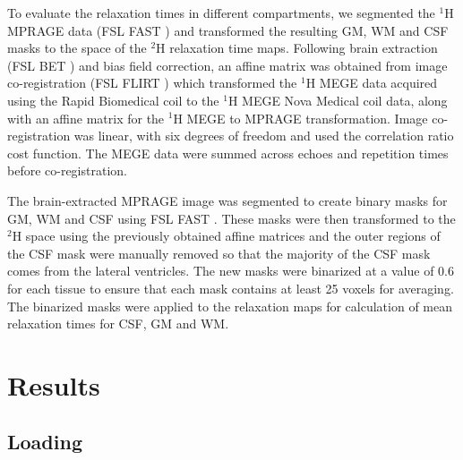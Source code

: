 To evaluate the relaxation times in different compartments, we segmented the $^1$H \ac{MPRAGE} data (FSL FAST \cite{Zhang2001SegmentationAlgorithm}) and transformed the resulting \ac{GM}, \ac{WM} and \ac{CSF} masks to the space of the $^2$H relaxation time maps. Following brain extraction (FSL BET \cite{Smith2002FastExtraction}) and bias field correction, an affine matrix was obtained from image co-registration (FSL FLIRT \cite{Jenkinson2001AImages,Jenkinson2002ImprovedImages}) which transformed the $^1$H \ac{MEGE} data acquired using the Rapid Biomedical coil to the $^1$H \ac{MEGE} Nova Medical coil data, along with an affine matrix for the $^1$H \ac{MEGE} to \ac{MPRAGE} transformation. Image co-registration was linear, with six degrees of freedom and used the correlation ratio cost function. The \ac{MEGE} data were summed across echoes and repetition times before co-registration.

The brain-extracted \ac{MPRAGE} image was segmented to create binary masks for \ac{GM}, \ac{WM} and \ac{CSF} using FSL FAST \cite{Zhang2001SegmentationAlgorithm}. These masks were then transformed to the $^2$H space using the previously obtained affine matrices and the outer regions of the CSF mask were manually removed so that the majority of the CSF mask comes from the lateral ventricles. The new masks were binarized at a value of 0.6 for each tissue to ensure that each mask contains at least 25 voxels for averaging. The binarized masks were applied to the relaxation maps for calculation of mean relaxation times for \ac{CSF}, \ac{GM} and \ac{WM}.

\section{Results}
\subsection{Loading}

